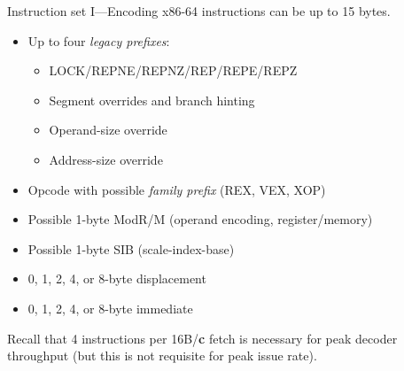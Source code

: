 \documentclass[mathserif,xcolor={dvipsnames,table}]{beamer}
\begin{document}
\begin{frame}{Instruction set I---Encoding}
x86-64 instructions can be up to 15 bytes.
\vfill
\begin{itemize}
\item Up to four \textit{legacy prefixes}:
\begin{itemize}
\item{LOCK/REPNE/REPNZ/REP/REPE/REPZ}
\item{Segment overrides and branch hinting}
\item{Operand-size override}
\item{Address-size override}
\end{itemize}
\item Opcode with possible \textit{family prefix} (REX, VEX, XOP)
\item Possible 1-byte ModR/M (operand encoding, register/memory)
\item Possible 1-byte SIB (scale-index-base)
\item 0, 1, 2, 4, or 8-byte displacement
\item 0, 1, 2, 4, or 8-byte immediate
\end{itemize}
\vfill
Recall that 4 instructions per 16B/\textbf{c} fetch is necessary for peak
decoder throughput (but this is not requisite for peak issue rate).
\end{frame}
\end{document}
